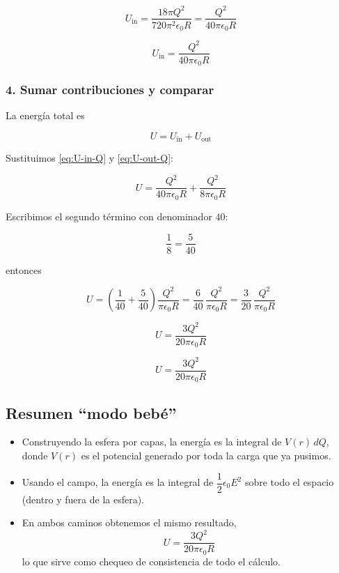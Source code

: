 \documentclass{article}
\begin{document}
\[
U_{\text{in}} = \frac{18\pi Q^{2}}{720\pi^{2}\epsilon_{0}R}
= \frac{Q^{2}}{40\pi\epsilon_{0}R}
\]

\begin{equation}
U_{\text{in}} = \frac{Q^{2}}{40\pi\epsilon_{0}R}
\label{eq:U-in-Q}
\end{equation}

\subsubsection*{4. Sumar contribuciones y comparar}

La energía total es

\[
U = U_{\text{in}} + U_{\text{out}}
\]

Sustituimos \eqref{eq:U-in-Q} y \eqref{eq:U-out-Q}:

\[
U = \frac{Q^{2}}{40\pi\epsilon_{0}R}
  + \frac{Q^{2}}{8\pi\epsilon_{0}R}
\]

Escribimos el segundo término con denominador $40$:

\[
\frac{1}{8} = \frac{5}{40}
\]

entonces

\[
U = \left(\frac{1}{40} + \frac{5}{40}\right)
     \frac{Q^{2}}{\pi\epsilon_{0}R}
= \frac{6}{40}\,\frac{Q^{2}}{\pi\epsilon_{0}R}
= \frac{3}{20}\,\frac{Q^{2}}{\pi\epsilon_{0}R}
\]

\begin{equation}
U = \frac{3Q^{2}}{20\pi\epsilon_{0}R}
\label{eq:U-final-campo}
\end{equation}

\[
\boxed{U = \dfrac{3Q^{2}}{20\pi\epsilon_{0}R}}
\]

\subsection*{Resumen “modo bebé”}

\begin{itemize}
  \item Construyendo la esfera por capas, la energía es la integral de $V(r)\,dQ$, donde $V(r)$ es el potencial generado por toda la carga que ya pusimos.
  \item Usando el campo, la energía es la integral de $\dfrac{1}{2}\epsilon_{0}E^{2}$ sobre todo el espacio (dentro y fuera de la esfera).
  \item En ambos caminos obtenemos el mismo resultado,
  \[
  U = \frac{3Q^{2}}{20\pi\epsilon_{0}R}
  \]
  lo que sirve como chequeo de consistencia de todo el cálculo.
\end{itemize}
\end{document}
